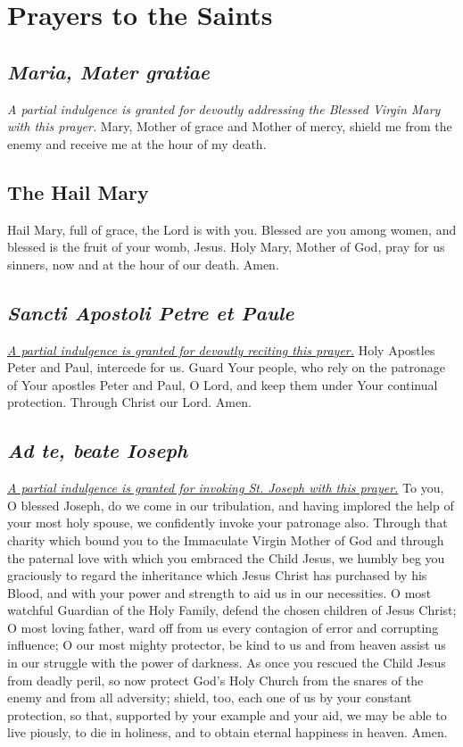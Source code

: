 \documentclass[12pt]{article}
\newcommand{\prayersection}[1]{\section{#1}}
\newcommand{\prayertitle}[1]{\subsection{#1}}
\newcommand{\indulgencedprayertitle}[1]{\prayertitle{#1 \protect\kreuz}}
\newcommand{\foreign}[1]{\textsl{#1}}
\newcommand{\note}[1]{{\small{\textsl{#1}}}\newline}
\newcommand{\linkednote}[2]{\hyperlink{#1}{\note{#2}}}
\begin{document}
\newpage

\prayersection{Prayers to the Saints}
\indulgencedprayertitle{\foreign{Maria, Mater gratiae}}
\note{A partial indulgence is granted for devoutly addressing the Blessed Virgin Mary with this prayer.}
Mary, Mother of grace and Mother of mercy, shield me from the enemy and receive me at the hour of my death.

\prayertitle{The Hail Mary}
Hail Mary, full of grace, the Lord is with you.
Blessed are you among women, and blessed is the fruit of your womb, Jesus.
Holy Mary, Mother of God, pray for us sinners, now and at the hour of our death.
Amen.

\indulgencedprayertitle{\foreign{Sancti Apostoli Petre et Paule}}
\linkednote{grant20}{A partial indulgence is granted for devoutly reciting this prayer.}
Holy Apostles Peter and Paul, intercede for us.
Guard Your people, who rely on the patronage of Your apostles Peter and Paul, O Lord, and keep them under Your continual protection.
Through Christ our Lord. Amen.

\indulgencedprayertitle{\foreign{Ad te, beate Ioseph}}
\linkednote{grant19}{A partial indulgence is granted for invoking St. Joseph with this prayer.}
To you, O blessed Joseph, do we come in our tribulation, and having implored the help of your most holy spouse, we confidently invoke your patronage also.
Through that charity which bound you to the Immaculate Virgin Mother of God and through the paternal love with which you embraced the Child Jesus, we humbly beg you graciously to regard the inheritance which Jesus Christ has purchased by his Blood, and with your power and strength to aid us in our necessities.
O most watchful Guardian of the Holy Family, defend the chosen children of Jesus Christ;
O most loving father, ward off from us every contagion of error and corrupting influence;
O our most mighty protector, be kind to us and from heaven assist us in our struggle with the power of darkness.
As once you rescued the Child Jesus from deadly peril, so now protect God’s Holy Church from the snares of the enemy and from all adversity;
shield, too, each one of us by your constant protection, so that, supported by your example and your aid, we may be able to live piously, to die in holiness, and to obtain eternal happiness in heaven.
Amen.
\end{document}
